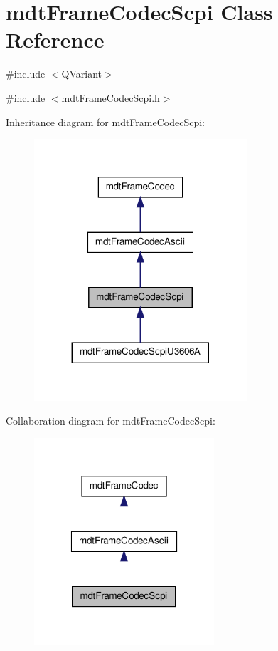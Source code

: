 \hypertarget{classmdt_frame_codec_scpi}{
\section{mdtFrameCodecScpi Class Reference}
\label{classmdt_frame_codec_scpi}
}


\#include $<$QVariant$>$  




{\ttfamily \#include $<$mdtFrameCodecScpi.h$>$}



Inheritance diagram for mdtFrameCodecScpi:\nopagebreak
\begin{figure}[H]
\begin{center}
\leavevmode
\includegraphics[width=224pt]{classmdt_frame_codec_scpi__inherit__graph}
\end{center}
\end{figure}


Collaboration diagram for mdtFrameCodecScpi:\nopagebreak
\begin{figure}[H]
\begin{center}
\leavevmode
\includegraphics[width=190pt]{classmdt_frame_codec_scpi__coll__graph}
\end{center}
\end{figure}
